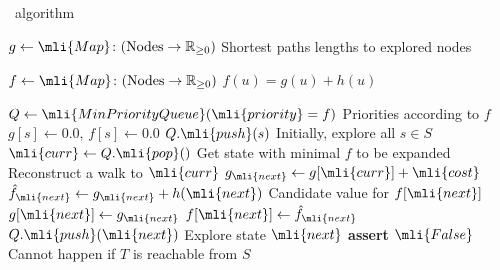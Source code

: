 \begin{algorithm}[H]
	\caption{\A~algorithm}\label{alg:astar}
	\begin{algorithmic}[1]
		\State $g \gets \mli{Map}\colon (\text{Nodes} \to \mathbb{R}_{\geq 0})$
		\Comment Shortest paths lengths to explored nodes

		\State $f \gets \mli{Map}\colon (\text{Nodes} \to \mathbb{R}_{\geq 0})$
		\Comment $f(u)=g(u)+h(u)$ 

		\State $Q \gets \mli{MinPriorityQueue}(\mli{priority}=f)$ 
		\Comment Priorities according to $f$
			\State $g[s] \gets 0.0,\, f[s] \gets 0.0$
			\State $Q.\mli{push}(s)$
			\Comment Initially, explore all $s \in S$
		\EndFor
			\State $\mli{curr} \gets Q.\mli{pop}()$
			\Comment Get state with minimal $f$ to be expanded
				\State \Return {}
				\Comment Reconstruct a walk to $\mli{curr}$
			\EndIf
			\State $g_\mli{next} \gets g[\mli{curr}] + \mli{cost}$
			\State $\hat{f}_\mli{next} \gets g_\mli{next} + h(\mli{next})$
				\Comment Candidate value for $f[\mli{next}]$
					\State $g[\mli{next}] \gets g_\mli{next}$		
					\State $f[\mli{next}] \gets \hat{f}_\mli{next}$		
					\State $Q.\mli{push}(\mli{next})$
					\Comment Explore state $\mli{next}$
				\EndIf
		\EndFor
		\EndWhile
		\State \textbf{assert} $\mli{False}$
		\Comment Cannot happen if $T$ is reachable from $S$
		\EndFunction

	\end{algorithmic}
\end{algorithm}

%
%
